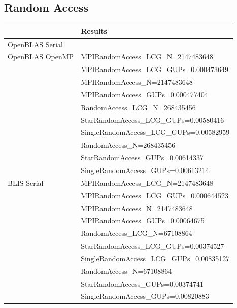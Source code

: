 \documentclass{report}
\begin{document}
%
%
\subsection{Random Access}

\begin{table}[H]
\begin{center}
\begin{tabular}{ |l|l| } 
\hline
                & Results \\ 
\hline
OpenBLAS Serial & \\ 
\hline
OpenBLAS OpenMP & MPIRandomAccess\_LCG\_N=2147483648 \\
                & MPIRandomAccess\_LCG\_GUPs=0.000473649 \\
                \cline{2-2} 
                & MPIRandomAccess\_N=2147483648 \\
                & MPIRandomAccess\_GUPs=0.000477404 \\
                \cline{2-2} 
                & RandomAccess\_LCG\_N=268435456 \\
                & StarRandomAccess\_LCG\_GUPs=0.00580416 \\
                & SingleRandomAccess\_LCG\_GUPs=0.00582959 \\
                \cline{2-2} 
                & RandomAccess\_N=268435456 \\
                & StarRandomAccess\_GUPs=0.00614337 \\
                & SingleRandomAccess\_GUPs=0.00613214 \\
\hline
BLIS Serial     & MPIRandomAccess\_LCG\_N=2147483648 \\
                & MPIRandomAccess\_LCG\_GUPs=0.000644523 \\
                \cline{2-2} 
                & MPIRandomAccess\_N=2147483648 \\
                & MPIRandomAccess\_GUPs=0.00064675 \\
                \cline{2-2} 
                & RandomAccess\_LCG\_N=67108864 \\
                & StarRandomAccess\_LCG\_GUPs=0.00374527 \\
                & SingleRandomAccess\_LCG\_GUPs=0.00835127 \\
                \cline{2-2} 
                & RandomAccess\_N=67108864 \\
                & StarRandomAccess\_GUPs=0.00374741 \\
                & SingleRandomAccess\_GUPs=0.00820883 \\

\end{tabular}
\end{center}
\end{table}
\end{document}
